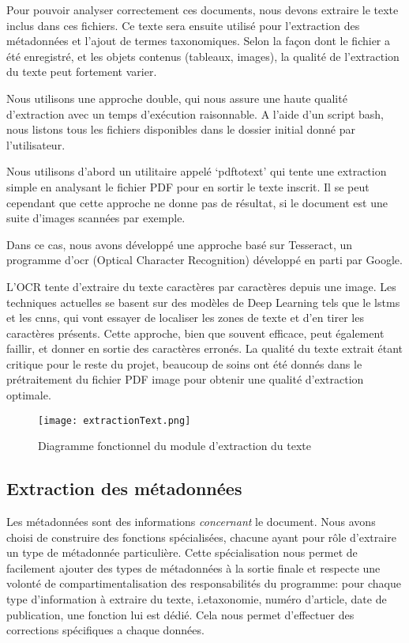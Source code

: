 Pour pouvoir analyser correctement ces documents, nous devons extraire le texte inclus dans ces fichiers.
Ce texte sera ensuite utilisé pour l'extraction des métadonnées et l'ajout de termes taxonomiques.
Selon la façon dont le fichier a été enregistré, et les objets contenus (tableaux, images), la qualité de l'extraction du texte peut fortement varier. 

Nous utilisons une approche double, qui nous assure une haute qualité d'extraction avec un temps d'exécution raisonnable.
A l'aide d'un script bash, nous listons tous les fichiers disponibles dans le dossier initial donné par l'utilisateur. 

Nous utilisons d'abord un utilitaire appelé `pdftotext' qui tente une extraction simple en analysant le fichier PDF pour en sortir le texte inscrit.
Il se peut cependant que cette approche ne donne pas de résultat, si le document est une suite d'images scannées par exemple.

Dans ce cas, nous avons développé une approche basé sur Tesseract\cite{tess}, un programme d'\gls{ocr} (Optical Character Recognition) développé en parti par Google. 

L'OCR tente d'extraire du texte caractères par caractères depuis une image.
Les techniques actuelles se basent sur des modèles de Deep Learning tels que le \glspl{lstm} et les \glspl{cnn}, qui vont essayer de localiser les zones de texte et d'en tirer les caractères présents.
Cette approche, bien que souvent efficace, peut également faillir, et donner en sortie des caractères erronés.
La qualité du texte extrait étant critique pour le reste du projet, beaucoup de soins ont été donnés dans le prétraitement du fichier PDF image pour obtenir une qualité d'extraction optimale.

\begin{figure}[h!]
  \centering
	\texttt{[image: extractionText.png]}
	\caption[]{Diagramme fonctionnel du module d'extraction du texte}
  \label{}
\end{figure}


\subsection{Extraction des métadonnées}
Les métadonnées sont des informations \textit{concernant} le document.
Nous avons choisi de construire des fonctions spécialisées, chacune ayant pour rôle d'extraire un type de métadonnée particulière.
Cette spécialisation nous permet de facilement ajouter des types de métadonnées à la sortie finale et respecte une volonté de compartimentalisation des responsabilités du programme: pour chaque type d'information à extraire du texte, i.e\. taxonomie, numéro d'article, date de publication, une fonction lui est dédié. 
Cela nous permet d'effectuer des corrections spécifiques a chaque données.

